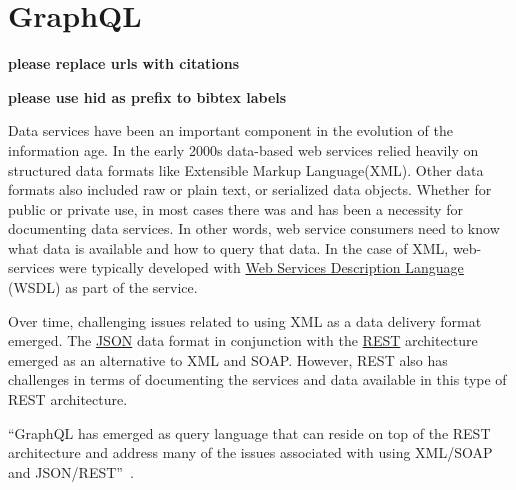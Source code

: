 \section{GraphQL}

{\bf please replace urls with citations}

{\bf please use  hid as prefix to bibtex labels}

Data services have been an important component in the evolution of the
information age.  In the early 2000s data-based web services relied
heavily on structured data formats like Extensible Markup
Language(XML).  Other data formats also included raw or plain text, or
serialized data objects.  Whether for public or private use, in most
cases there was and has been a necessity for documenting data
services.  In other words, web service consumers need to know what
data is available and how to query that data.  In the case of XML,
web-services were typically developed with \href{https://en.wikipedia.org/wiki/Web_Services_Description_Language}
{Web Services Description Language} (WSDL) as part of the service.

Over time, challenging issues related to using XML as a data delivery format 
emerged.  The \href{https://en.wikipedia.org/wiki/JSON}{JSON} data format in 
conjunction with the \href{https://en.wikipedia.org/wiki/Representational_state_transfer}{REST} 
architecture emerged as an alternative to XML and SOAP.  However, REST also has 
challenges in terms of documenting the services and data available in this 
type of REST architecture.

``GraphQL has emerged as query language that can reside on top of the REST 
architecture and address many of the issues associated with using XML/SOAP and 
JSON/REST''~\cite{GraphQL2018}.
